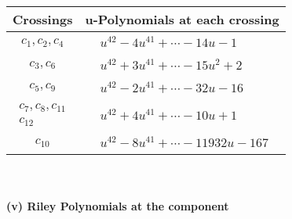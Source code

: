 \documentclass[1p]{elsarticle_modified}
\theoremstyle{definition}
\begin{document}
\begin{tabular}{m{50pt}|m{274pt}}
Crossings & \hspace{64pt}u-Polynomials at each crossing \\
\hline $$\begin{aligned}c_{1},c_{2},c_{4}\end{aligned}$$&$\begin{aligned}
&u^{42}-4 u^{41}+\cdots-14 u-1
\end{aligned}$\\
\hline $$\begin{aligned}c_{3},c_{6}\end{aligned}$$&$\begin{aligned}
&u^{42}+3 u^{41}+\cdots-15 u^2+2
\end{aligned}$\\
\hline $$\begin{aligned}c_{5},c_{9}\end{aligned}$$&$\begin{aligned}
&u^{42}-2 u^{41}+\cdots-32 u-16
\end{aligned}$\\
\hline $$\begin{aligned}c_{7},c_{8},c_{11}\\c_{12}\end{aligned}$$&$\begin{aligned}
&u^{42}+4 u^{41}+\cdots-10 u+1
\end{aligned}$\\
\hline $$\begin{aligned}c_{10}\end{aligned}$$&$\begin{aligned}
&u^{42}-8 u^{41}+\cdots-11932 u-167
\end{aligned}$\\
\hline
\end{tabular}\\~\\
\newpage\renewcommand{\arraystretch}{1}
\flushleft \textbf{(v) Riley Polynomials at the component}\newline \\
\end{document}
